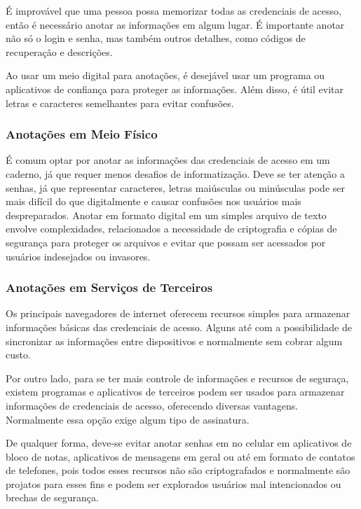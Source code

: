 \documentclass[12pt]{article}
\begin{document}
É improvável que uma pessoa possa memorizar todas as credenciais de acesso,
então é necessário anotar as informações em algum lugar.
É importante anotar não só o login e senha, mas também outros detalhes,
como códigos de recuperação e descrições.

Ao usar um meio digital para anotações, é desejável usar um programa ou
aplicativos de confiança para proteger as informações. Além disso, é útil
evitar letras e caracteres semelhantes para evitar confusões.

\subsubsection{Anotações em Meio Físico}

É comum optar por anotar as informações das credenciais de acesso em um
caderno, já que requer menos desafios de informatização.
Deve se ter atenção a senhas, já que representar caracteres, letras
maiúsculas ou minúsculas pode ser mais difícil do que digitalmente e
causar confusões nos usuários mais despreparados.
Anotar em formato digital em um simples arquivo de texto envolve
complexidades, relacionados a necessidade de criptografia e cópias de
segurança para proteger os arquivos e evitar que possam ser
acessados por usuários indesejados ou invasores.

\subsubsection{Anotações em Serviços de Terceiros}

Os principais navegadores de internet oferecem recursos simples para
armazenar informações básicas das credenciais de acesso. Alguns até
com a possibilidade de sincronizar as informações entre dispositivos e
normalmente sem cobrar algum custo.

Por outro lado, para se ter mais controle de informações e recursos de
seguraça, existem programas e aplicativos de terceiros podem ser usados
para armazenar informações de credenciais de acesso, oferecendo diversas
vantagens. Normalmente essa opção exige algum tipo de assinatura.

De qualquer forma, deve-se evitar anotar senhas em no celular em
aplicativos de bloco de notas, aplicativos de mensagens em geral ou até
em formato de contatos de telefones, pois todos esses recursos não são
criptografados e normalmente são projatos para esses fins e podem ser
explorados usuários mal intencionados ou brechas de segurança.
\end{document}
